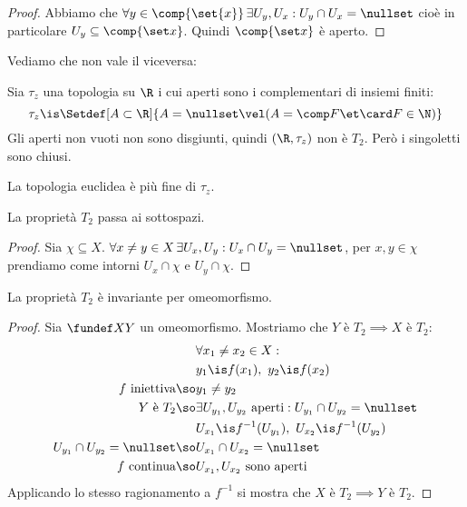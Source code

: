 \begin{proof}
	Abbiamo che $\forall y\in\comp{\set{x}}\,\exists U_y,U_x:U_y\cap U_x=\nullset$
	cioè in particolare $U_y\subseteq\comp{\set x}$.
	Quindi $\comp{\set x}$ è aperto.
\end{proof}

Vediamo che non vale il viceversa:

\begin{es}
	Sia $\tau_z$ una topologia su $\R$ i cui aperti sono i complementari di insiemi finiti:
	\[\tau_z\is\Setdef[A\subset\R]{A=\nullset\vel(A=\comp F\et\card F\in\N)}\]
	Gli aperti non vuoti non sono disgiunti, quindi $(\R,\tau_z)$ non è $T_2$.
	Però i singoletti sono chiusi.
\end{es}

\begin{oss}
La topologia euclidea è più fine di $\tau_z$.
\end{oss}

\begin{prop}
	La proprietà $T_2$ passa ai sottospazi.
\end{prop}

\begin{proof}
	Sia $\chi\subseteq X$.
	$\forall x\neq y\in X\,\exists U_x,U_y:U_x\cap U_y=\nullset$,
	per $x,y\in\chi$ prendiamo come intorni $U_x\cap\chi$ e $U_y\cap\chi$.
\end{proof}

\begin{prop}
	La proprietà $T_2$ è invariante per omeomorfismo.
\end{prop}

\begin{proof}
	Sia $\fundef XY$ un omeomorfismo. Mostriamo che $Y\text{ è }T_2\implies X\text{ è }T_2$:
	\begin{align*}
		&\forall x_1\neq x_2\in X:\\
		&y_1\is f(x_1),\ y_2\is f(x_2)\\
		f\text{ iniettiva}\so&y_1\neq y_2\\
		Y\text{ è }T_2\so&\exists U_{y_1},U_{y_2}\text{ aperti}:U_{y_1}\cap U_{y_2}=\nullset\\
		&U_{x_1}\is f^{-1}(U_{y_1}),\ U_{x_2}\is f^{-1}(U_{y_2})\\
		U_{y_1}\cap U_{y_2}=\nullset\so&U_{x_1}\cap U_{x_2}=\nullset\\
		f\text{ continua}\so&U_{x_1}, U_{x_2}\text{ sono aperti}
	\end{align*}
	Applicando lo stesso ragionamento a $f^{-1}$ si mostra che $X\text{ è }T_2\implies Y\text{ è }T_2$.
\end{proof}

